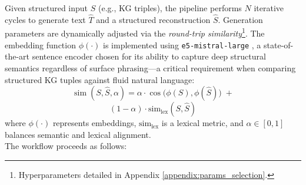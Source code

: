 \documentclass[11pt]{article}
\begin{document}
Given structured input $S$ (e.g., KG triples), the pipeline performs $N$ iterative cycles to generate text $\hat T$ and a structured reconstruction $\hat{S}$. Generation parameters are dynamically adjusted via the \textit{round-trip similarity}\footnote{Hyperparameters detailed in Appendix \ref{appendix:params_selection}.}.
The embedding function $\phi(\cdot)$ is implemented using \texttt{e5-mistral-large} \citep{Wang2023E5}, a state-of-the-art sentence encoder chosen for its ability to capture deep structural semantics regardless of surface phrasing---a critical requirement when comparing structured KG tuples against fluid natural language:
\[
\operatorname{sim}(S,\hat S, \alpha)=
\alpha \cdot \cos\bigl(\phi(S),\phi(\hat S)\bigr)
\;+
\]
\[
(1-\alpha)\cdot \mathrm{sim}_{\text{lex}}(S,\hat S)
\]
where $\phi(\cdot)$ represents embeddings, $\mathrm{sim}_{\text{lex}}$ is a lexical metric, and $\alpha \in [0,1]$ balances semantic and lexical alignment.\\

\noindent The workflow proceeds as follows:
\end{document}
